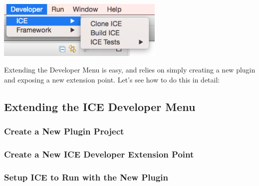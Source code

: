 \documentclass{article}
\begin{document}
\begin{center}
\includegraphics[width=8cm]{figures/devcloneice.png}
\label{fig:devcloneice}
\end{center}

Extending the Developer Menu is easy, and relies on simply creating a new plugin
and exposing a new extension point. Let's see how to do this in detail:

\subsection{Extending the ICE Developer Menu}
\subsubsection{Create a New Plugin Project}
\subsubsection{Create a New ICE Developer Extension Point}
\subsubsection{Setup ICE to Run with the New Plugin}
\end{document}
